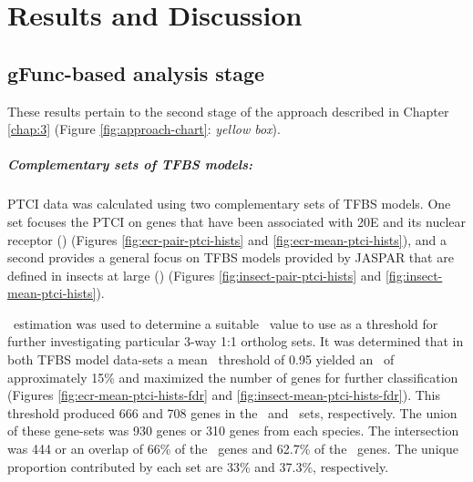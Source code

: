 

\chapter{Results and Discussion} \label{chap:4}

% 

\section{gFunc-based analysis stage}

These results pertain to the second stage of the approach described in Chapter \ref{chap:3} (Figure \ref{fig:approach-chart}: \textit{yellow box}).

\paragraph*{Complementary sets of TFBS models:}
\gls{PTCI} data was calculated using two complementary sets of \gls{TFBS} models.
%
One set focuses the \gls{PTCI} on genes that have been associated with \gls{20E} and its nuclear receptor (\PTCIe) (Figures \ref{fig:ecr-pair-ptci-hists} and \ref{fig:ecr-mean-ptci-hists}), and a second provides a general focus on \gls{TFBS} models provided by JASPAR that are defined in insects at large (\PTCIi) (Figures \ref{fig:insect-pair-ptci-hists} and \ref{fig:insect-mean-ptci-hists}).
%




%
\FDR\ estimation was used to determine a suitable \PTCI\ value to use as a threshold for further investigating particular 3-way 1:1 ortholog sets.
%
It was determined that in both \gls{TFBS} model data-sets a mean \PTCI\ threshold of 0.95 yielded an \FDR\ of approximately 15\% and maximized the number of genes for further classification (Figures \ref{fig:ecr-mean-ptci-hists-fdr} and \ref{fig:insect-mean-ptci-hists-fdr}).
%
This threshold produced 666 and 708 genes in the \PTCIi\ and \PTCIe\ sets, respectively.
%
The union of these gene-sets was 930 genes or 310 genes from each species.
%
The intersection was 444 or an overlap of 66\% of the \PTCIi\ genes and 62.7\% of the \PTCIe\ genes.
%
The unique proportion contributed by each set are 33\% and 37.3\%, respectively.

